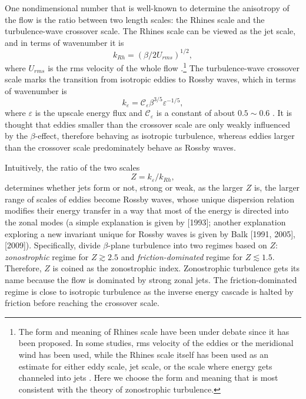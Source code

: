 \documentclass{ametsoc}
\begin{document}
One nondimensional number that is well-known to determine the anisotropy
of the flow is the ratio between two length scales: the Rhines scale
and the turbulence-wave crossover scale. The Rhines scale
can be viewed as the jet scale, and in terms of wavenumber it is
\begin{equation}
    k_{Rh}=(\beta/2U_{rms})^{1/2},\label{eq:Rhines_wavenumber_beta_Urms}
\end{equation}
where $U_{rms}$ is the rms velocity of the whole flow \citep{Rhines1975}.\footnote{
The form and meaning of Rhines scale have been
under debate since it has been proposed. In some studies, rms velocity
of the eddies or the meridional wind has been used, while the Rhines scale itself
has been used as an estimate for either eddy scale, jet scale, or
the scale where energy gets channeled into jets \citep{Williams1978,Jansen2012,Chai2014,Liu2015,Chemke2015}.
Here we choose the form and meaning that is most consistent 
with the theory of zonostrophic turbulence.}
The turbulence-wave crossover scale marks the transition from
isotropic eddies to Rossby waves, which in terms of wavenumber is
\begin{equation}
    k_{\varepsilon}=\mathcal{C}_{\varepsilon}\beta^{3/5}\varepsilon^{-1/5},\label{eq:classical_crossover_wavenumber}
\end{equation}
where $\varepsilon$ is the upscale energy flux and $\mathcal{C}_{\varepsilon}$ is a constant of about
$0.5\sim0.6$ \citep{Vallis1993,Galperin2010,Smith2002}. It is thought that
eddies smaller than the crossover scale are only weakly influenced by the 
$\beta$-effect, therefore behaving as isotropic turbulence, whereas eddies 
larger than the crossover scale predominately behave as Rossby waves.

Intuitively, the ratio of the two scales
\begin{equation}
    Z=k_{\varepsilon}/k_{Rh},\label{eq:zonostrophic_index_def}
\end{equation}
determines whether jets form or not, strong or weak, as the larger
$Z$ is, the larger range of scales of eddies become Rossby waves, whose
unique dispersion relation modifies their energy transfer in a way 
that most of the energy is directed into the zonal modes (a simple explanation 
is given by \citeauthor{Vallis1993}
{[}1993{]}; another explanation exploring a new invariant unique for
Rossby waves is given by \nocite{Balk1991,Balk2005}Balk {[}1991,
2005{]}, \citeauthor{Nazarenko2009} {[}2009{]}).
Specifically, \citet{Galperin2010}
divide $\beta$-plane turbulence into two regimes based on $Z$: 
\textit{zonostrophic} regime for $Z\gtrsim2.5$ and 
\textit{friction-dominated} regime for $Z\lesssim1.5$. 
Therefore, $Z$ is coined as the zonostrophic index. 
Zonostrophic turbulence gets its name because the flow
is dominated by strong zonal jets. The friction-dominated
regime is close to isotropic turbulence as the inverse energy cascade
is halted by friction before reaching the crossover scale.
\end{document}
